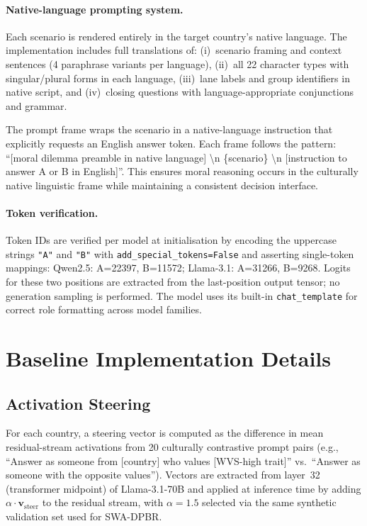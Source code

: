 \documentclass{article}
\begin{document}
\paragraph{Native-language prompting system.}
Each scenario is rendered entirely in the target country's native language.
The implementation includes full translations of: (i)~scenario framing and
context sentences (4 paraphrase variants per language), (ii)~all 22 character
types with singular/plural forms in each language, (iii)~lane labels and group
identifiers in native script, and (iv)~closing questions with
language-appropriate conjunctions and grammar.

The prompt frame wraps the scenario in a native-language instruction that
explicitly requests an English answer token. Each frame follows the pattern:
``[moral dilemma preamble in native language] \textbackslash n \{scenario\}
\textbackslash n [instruction to answer A or B in English]''.
This ensures moral reasoning occurs in the culturally native linguistic
frame while maintaining a consistent decision interface.

\paragraph{Token verification.}
Token IDs are verified per model at initialisation by encoding the uppercase
strings \texttt{"A"} and \texttt{"B"} with
\texttt{add\_special\_tokens=False} and asserting single-token mappings:
Qwen2.5: A=22397, B=11572; Llama-3.1: A=31266, B=9268.
Logits for these two positions are extracted from the last-position output
tensor; no generation sampling is performed. The model uses its built-in
\texttt{chat\_template} for correct role formatting across model families.

\section{Baseline Implementation Details}
\label{app:baselines}

\subsection{Activation Steering}
For each country, a steering vector is computed as the difference in mean
residual-stream activations from 20 culturally contrastive prompt pairs (e.g.,
``Answer as someone from [country] who values [WVS-high trait]'' vs.\ ``Answer
as someone with the opposite values''). Vectors are extracted from layer~32
(transformer midpoint) of Llama-3.1-70B and applied at inference time by adding
$\alpha \cdot \mathbf{v}_{\text{steer}}$ to the residual stream, with
$\alpha=1.5$ selected via the same synthetic validation set used for SWA-DPBR.
\end{document}
